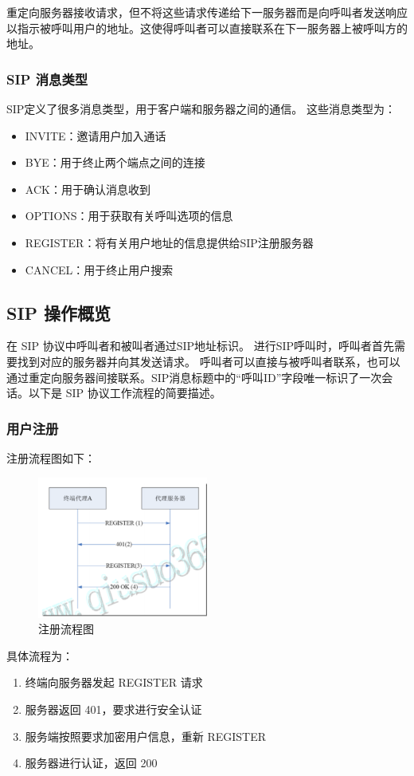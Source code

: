 \documentclass[lang=cn]{elegantpaper}
\begin{document}
重定向服务器接收请求，但不将这些请求传递给下一服务器而是向呼叫者发送响应以指示被呼叫用户的地址。这使得呼叫者可以直接联系在下一服务器上被呼叫方的地址。

\subsubsection{SIP 消息类型}
SIP定义了很多消息类型，用于客户端和服务器之间的通信。 这些消息类型为：

\begin{itemize}
    \item INVITE：邀请用户加入通话
    \item BYE：用于终止两个端点之间的连接
    \item ACK：用于确认消息收到
    \item OPTIONS：用于获取有关呼叫选项的信息
    \item REGISTER：将有关用户地址的信息提供给SIP注册服务器
    \item CANCEL：用于终止用户搜索
\end{itemize}

\subsection{SIP 操作概览}

在 SIP 协议中呼叫者和被叫者通过SIP地址标识。 进行SIP呼叫时，呼叫者首先需要找到对应的服务器并向其发送请求。 呼叫者可以直接与被呼叫者联系，也可以通过重定向服务器间接联系。SIP消息标题中的“呼叫ID”字段唯一标识了一次会话。以下是 SIP 协议工作流程的简要描述。

\subsubsection{用户注册}
注册流程图如下：
\begin{figure}[H]
    \centering
    \includegraphics[width=0.5\textwidth]{11}
    \caption{注册流程图}
    \label{fig:register}
\end{figure}
具体流程为：
\begin{enumerate}
    \item 终端向服务器发起 REGISTER 请求
    \item 服务器返回 401，要求进行安全认证
    \item 服务端按照要求加密用户信息，重新 REGISTER
    \item 服务器进行认证，返回 200
\end{enumerate}
\end{document}
